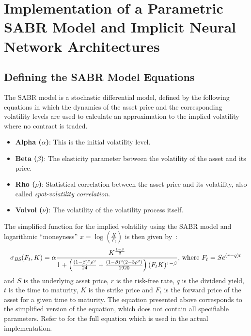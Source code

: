 \section{Implementation of a Parametric SABR Model and Implicit Neural Network Architectures}
\label{sec:implementation}

\subsection{Defining the SABR Model Equations}
\label{subsec:sabr}
The SABR model is a stochastic differential model, defined by the following equations in which the dynamics of the
asset price and the corresponding volatility levels are used to calculate an approximation to the implied volatility where no contract is traded.
\begin{itemize}
    \item \textbf{Alpha (\(\alpha\))}: This is the initial volatility level.
    \item \textbf{Beta (\(\beta\))}: The elasticity parameter between the volatility of the asset and its price.
    \item \textbf{Rho (\(\rho\))}: Statistical correlation between the asset price and its volatility, also called \textit{spot-volatility correlation}.
    \item \textbf{Volvol (\(\nu\))}: The volatility of the volatility process itself.
\end{itemize}

The simplified function for the implied volatility using the SABR model and logarithmic
``moneyness'' $x = \log\left(\frac{K}{F_t}\right)$ is then given by~\cite{Hagan2002}:
\begin{equation*}
    \sigma_{\textit{BS}}(F_t, K) =
    \alpha \frac{K^{\frac{1 - \beta}{2}}}{1 + \left( \frac{(1 - \beta)^2 \rho^2}{24} + \frac{(1 - \beta)^2(2 - 3\rho^2)}{1920} \right) (F_t K)^{1 - \beta}}\\
    \text{, where } F_t = S e^{(r - q)t}
\end{equation*}
and $S$ is the underlying asset price, $r$ is the risk-free rate, $q$ is the dividend yield, $t$ is the time to maturity,
$K$ is the strike price and $F_t$ is the forward price of the asset for a given time to maturity.
The equation presented above corresponds to the simplified version of the equation,
which does not contain all specifiable parameters.
Refer to  for the full equation which is used in the actual implementation.

